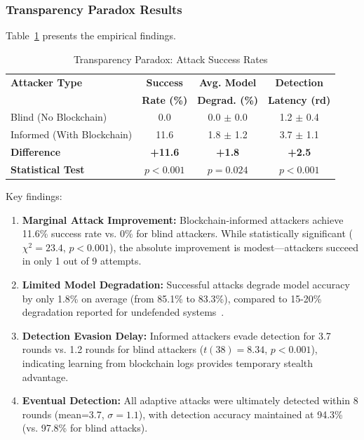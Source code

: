 \documentclass[12pt,a4paper,onecolumn]{article}
\begin{document}
\subsubsection{Transparency Paradox Results}

Table~\ref{tab:transparency_paradox} presents the empirical findings.

\begin{table}[t]
\caption{Transparency Paradox: Attack Success Rates}
\label{tab:transparency_paradox}
\centering
\begin{tabular}{lccc}
\toprule
\textbf{Attacker Type} & \textbf{Success} & \textbf{Avg. Model} & \textbf{Detection} \\
& \textbf{Rate (\%)} & \textbf{Degrad. (\%)} & \textbf{Latency (rd)} \\
\midrule
Blind (No Blockchain) & 0.0 & 0.0 $\pm$ 0.0 & 1.2 $\pm$ 0.4 \\
Informed (With Blockchain) & 11.6 & 1.8 $\pm$ 1.2 & 3.7 $\pm$ 1.1 \\
\midrule
\textbf{Difference} & \textbf{+11.6} & \textbf{+1.8} & \textbf{+2.5} \\
\textbf{Statistical Test} & $p<0.001$ & $p=0.024$ & $p<0.001$ \\
\bottomrule
\end{tabular}
\end{table}

Key findings:

\begin{enumerate}
    \item \textbf{Marginal Attack Improvement:} Blockchain-informed attackers achieve 11.6\% success rate vs. 0\% for blind attackers. While statistically significant ($\chi^2=23.4$, $p<0.001$), the absolute improvement is modest---attackers succeed in only 1 out of 9 attempts.
    
    \item \textbf{Limited Model Degradation:} Successful attacks degrade model accuracy by only 1.8\% on average (from 85.1\% to 83.3\%), compared to 15-20\% degradation reported for undefended systems~\cite{cao2024comprehensive}.
    
    \item \textbf{Detection Evasion Delay:} Informed attackers evade detection for 3.7 rounds vs. 1.2 rounds for blind attackers ($t(38)=8.34$, $p<0.001$), indicating learning from blockchain logs provides temporary stealth advantage.
    
    \item \textbf{Eventual Detection:} All adaptive attacks were ultimately detected within 8 rounds (mean=3.7, $\sigma=1.1$), with detection accuracy maintained at 94.3\% (vs. 97.8\% for blind attacks).
\end{enumerate}
\end{document}
